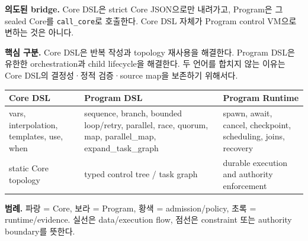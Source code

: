 \documentclass[a4paper,landscape]{article}
\begin{document}
\textbf{의도된 bridge.} Core DSL은 strict Core JSON으로만 내려가고, Program은 그 sealed Core를 \texttt{call\_core}로 호출한다. Core DSL 자체가 Program control VM으로 변하는 것은 아니다.

\textbf{핵심 구분.} Core DSL은 반복 작성과 topology 재사용을 해결한다. Program DSL은 유한한 orchestration과 child lifecycle을 해결한다. 두 언어를 합치지 않는 이유는 Core DSL의 결정성·정적 검증·source map을 보존하기 위해서다.

\begin{center}
\begin{tabular}{p{}p{}p{}}
\toprule
\textbf{Core DSL} & \textbf{Program DSL} & \textbf{Program Runtime} \\
\midrule
vars, interpolation, templates, use, when & sequence, branch, bounded loop/retry, \mbox{parallel}, race, quorum, map, \mbox{parallel\_map}, \mbox{expand\_task\_graph} & spawn, await, cancel, checkpoint, scheduling, joins, recovery \\
static Core topology & typed control tree / task graph & durable execution and authority enforcement \\
\bottomrule
\end{tabular}
\end{center}
\textbf{범례.} \textcolor{coreblue}{파랑} = Core, \textcolor{programviolet}{보라} = Program, \textcolor{policyamber}{황색} = admission/policy, \textcolor{runtimegreen}{초록} = runtime/evidence. 실선은 data/execution flow, 점선은 constraint 또는 authority boundary를 뜻한다.

\newpage
\end{document}
